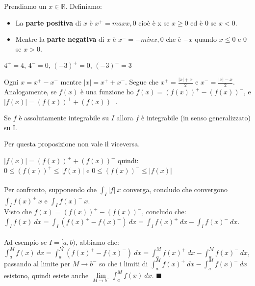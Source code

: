 \begin{definition}
Prendiamo un $x\in \mathbb{R}$. Definiamo:
\begin{itemize}
    \item La \textbf{parte positiva} di $x$ è $x^+ = max{x,0}$ cioè è x se $x \geq 0$ ed è 0 se $x < 0$. 
    \item Mentre la \textbf{parte negativa} di $x$ è $x^- = -min{x,0}$ che è $-x$ quando $x\leq 0$ e 0 se $x>0$.
\end{itemize}
\end{definition}

\begin{example}
$4^+ = 4$, $4^- = 0$, $(-3)^+ = 0$, $(-3)^- = 3$
\end{example}

\begin{observation}
Ogni $x = x^+ - x^-$ mentre $|x| = x^+ + x^-$. Segue che $x^+ = \frac{|x| + x}{2}$ e $x^- = \frac{|x|-x}{2}$.\\
Analogamente, se $f(x)$ è una funzione ho $f(x) = (f(x))^+ - (f(x))^-$, e $|f(x)| = (f(x))^+ + (f(x))^-$.
\end{observation}

\begin{proposition}
Se $f$ è assolutamente integrabile su $I$ allora $f$ è integrabile (in senso generalizzato) su I. 
\end{proposition}

\hspace{-15pt}Per questa proposizione non vale il viceversa.

\begin{demostration}
$|f(x)| = (f(x))^+ + (f(x))^-$ quindi:\\
$0 \leq (f(x))^+ \leq |f(x)|$ e $0 \leq (f(x))^- \leq |f(x)|$\\\\
Per confronto, supponendo che $\int_I |f|\:x$ converga, concludo che convergono $\int_I f(x)^+\:x$ e $\int_I f(x)^-\:x$.\\
Visto che $f(x) = (f(x))^+ - (f(x))^-$, concludo che: \\
$\int_I f(x)\:dx = \int_I (f(x)^+ - f(x)^-)\:dx = \int_I f(x)^+\:dx - \int_I f(x)^- \:dx$.\\\\
Ad esempio se $I = [a,b)$, abbiamo che:\\
$\int_a^M f(x)\:dx = \int_a^M (f(x)^+ - f(x)^-)\:dx = \int_a^M f(x)^+\:dx - \int_a^M f(x)^- \:dx$, passando al limite per $M\to b^-$ so che i limiti di $\int_a^M f(x)^+\:dx - \int_a^M f(x)^- \:dx$ esistono, quindi esiste anche $\lim\limits_{M\to b^-}\int_a^M f(x)\:dx$. $\blacksquare$
\end{demostration}

